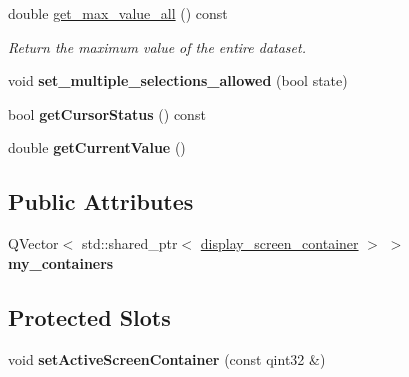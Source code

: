 \begin{DoxyCompactItemize}
\mbox{\label{classScreen__manager_a39bc17ac270cdea092e20bed9d3a1e65}} 
double \mbox{\hyperlink{classScreen__manager_a39bc17ac270cdea092e20bed9d3a1e65}{get\+\_\+max\+\_\+value\+\_\+all}} () const
\begin{DoxyCompactList}\small\item\em Return the maximum value of the entire dataset. \end{DoxyCompactList}\item 
\mbox{\label{classScreen__manager_ad1cd939deb35910262eaa503018ea1b6}} 
void {\bfseries set\+\_\+multiple\+\_\+selections\+\_\+allowed} (bool state)
\item 
\mbox{\label{classScreen__manager_afb1943d5f00971d44c607a35d2f14400}} 
bool {\bfseries get\+Cursor\+Status} () const
\item 
\mbox{\label{classScreen__manager_a2f34df85df98b630cc76c44f95191b0c}} 
double {\bfseries get\+Current\+Value} ()
\end{DoxyCompactItemize}
\subsection*{Public Attributes}
\begin{DoxyCompactItemize}
\item 
\mbox{\label{classScreen__manager_ad20150bef59ac873d47c7dccb5062258}} 
Q\+Vector$<$ std\+::shared\+\_\+ptr$<$ \mbox{\hyperlink{classdisplay__screen__container}{display\+\_\+screen\+\_\+container}} $>$ $>$ {\bfseries my\+\_\+containers}
\end{DoxyCompactItemize}
\subsection*{Protected Slots}
\begin{DoxyCompactItemize}
\item 
\mbox{\label{classScreen__manager_a9f814711fe49f63a404758ffb39f63cc}} 
void {\bfseries set\+Active\+Screen\+Container} (const qint32 \&)
\end{DoxyCompactItemize}
